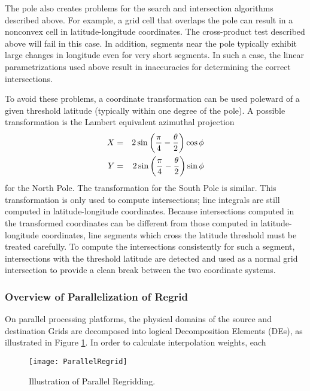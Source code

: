      The pole also creates problems for the search and intersection algorithms
     described above.  For example, a grid cell that overlaps the pole can
     result in a nonconvex cell in latitude-longitude coordinates.  The
     cross-product test described above will fail in this case.  In addition,
     segments near the pole typically exhibit large changes in longitude even
     for very short segments.  In such a case, the linear parametrizations used
     above result in inaccuracies for determining the correct intersections.

     To avoid these problems, a coordinate transformation can be used poleward
     of a given threshold latitude (typically within one degree of the pole).
     A possible transformation is the Lambert equivalent azimuthal projection
\begin{eqnarray}
X &=& 2\sin\left({\pi \over 4} - {\theta \over 2}\right)\cos\phi \nonumber \\
Y &=& 2\sin\left({\pi \over 4} - {\theta \over 2}\right)\sin\phi 
\end{eqnarray}
     for the North Pole.  The transformation for the South Pole is similar.
     This transformation is only used to compute intersections; line integrals
     are still computed in latitude-longitude coordinates.  Because intersections
     computed in the transformed coordinates can be different from those computed
     in latitude-longitude coordinates, line segments which cross the latitude
     threshold must be treated carefully.  To compute the intersections
     consistently for such a segment, intersections with the threshold latitude
     are detected and used as a normal grid intersection to provide a clean break
     between the two coordinate systems.

\subsubsection{Overview of Parallelization of Regrid}
On parallel processing platforms, the physical domains of the source and
destination Grids are decomposed into logical Decomposition Elements (DEs), as
illustrated in Figure \ref{fig:ParallelRegrid}.  In order to calculate
interpolation weights, each

\begin{center}
\begin{figure}
\caption{Illustration of Parallel Regridding. }
\label{fig:ParallelRegrid}
\resizebox{\textwidth}{!}
  {\texttt{[image: ParallelRegrid]}}
\end{figure}
\end{center}

